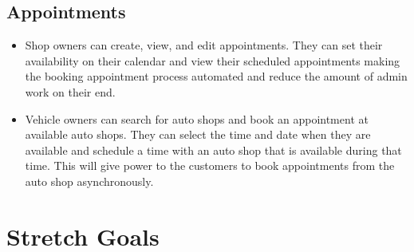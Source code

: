 \documentclass{article}
\begin{document}
\subsection{Appointments}
\begin{itemize}
\item Shop owners can create, view, and edit appointments. They can set their availability on their calendar and view their scheduled appointments making the booking appointment process automated and reduce the amount of admin work on their end.
\item Vehicle owners can search for auto shops and book an appointment at available auto shops. They can select the time and date when they are available and schedule a time with an auto shop that is available during that time. This will give power to the customers to book appointments from the auto shop asynchronously.
\end{itemize}

\section{Stretch Goals}
\end{document}
